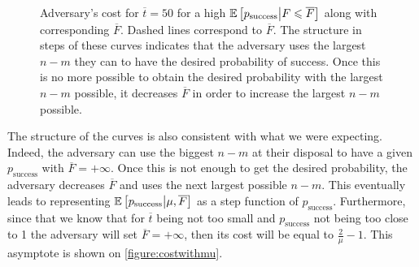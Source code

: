 \begin{figure}[ht]
    \centering
    \caption{Adversary's cost for \(\overline{t}=50\) for a high \(\mathbb{E}\left[p_{\text{success}}\middle|F\leqslant\overline{F}\right]\) along with corresponding \(\overline{F}\). Dashed lines correspond to \(\overline{F}\). The structure in steps of these curves indicates that the adversary uses the largest \(n-m\) they can to have the desired probability of success. Once this is no more possible to obtain the desired probability with the largest \(n-m\) possible, it decreases \(\overline{F}\) in order to increase the largest \(n-m\) possible.}
    \label{figure:setuptimewithpsuccesszoom}
\end{figure}

The structure of the curves is also consistent with what we were expecting. Indeed, the adversary can use the biggest \(n - m\) at their disposal to have a given \(p_{\text{success}}\) with \(\overline{F}=+\infty\). Once this is not enough to get the desired probability, the adversary decreases \(\overline{F}\) and uses the next largest possible \(n - m\). This eventually leads to representing \(\mathbb{E}\left[p_{\text{success}}\middle|\mu,\overline{F}\right]\) as a step function of \(p_{\text{success}}\). Furthermore, since that we know that for \(\overline{t}\) being not too small and \(p_{\text{success}}\) not being too close to 1 the adversary will set \(\overline{F}=+\infty\), then its cost will be equal to \(\frac{2}{\mu}-1\). This asymptote is shown on \autoref{figure:costwithmu}.

